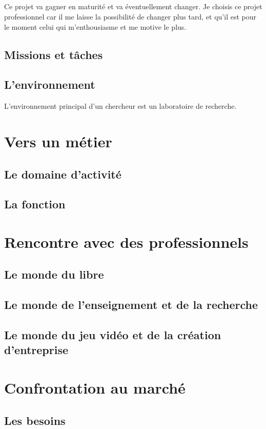 \documentclass[a4paper,12pt, draft]{report}
\begin{document}
\paragraph{}
Ce projet va gagner en maturité et va éventuellement changer.
Je choisis ce projet professionnel car il me laisse la possibilité de changer plus tard, et qu'il est pour le moment celui qui m'enthousiasme et me motive le plus.


\section{Missions et tâches}
\section{L'environnement}
L'environnement principal d'un chercheur est un laboratoire de recherche.

\chapter{Vers un métier}
\section{Le domaine d'activité}
\section{La fonction}

\chapter{Rencontre avec des professionnels}
\section{Le monde du libre}
\section{Le monde de l'enseignement et de la recherche}
\section{Le monde du jeu vidéo et de la création d'entreprise}

\chapter{Confrontation au marché}
\section{Les besoins}
\end{document}

